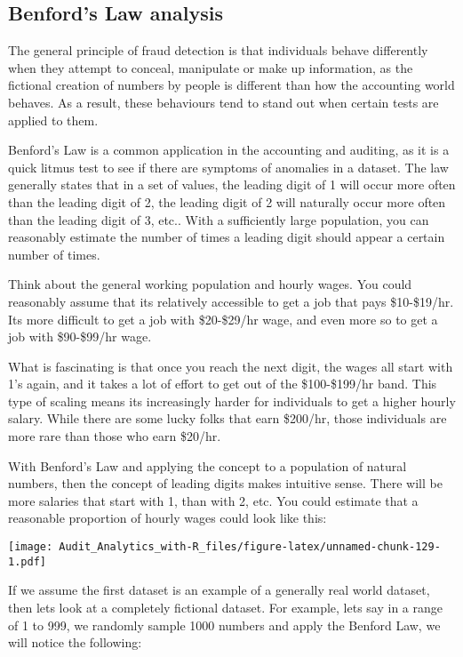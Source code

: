 \documentclass[
]{book}
\begin{document}
\hypertarget{benfords-law-analysis}{%
\subsection{Benford's Law analysis}\label{benfords-law-analysis}}

The general principle of fraud detection is that individuals behave differently when they attempt to conceal, manipulate or make up information, as the fictional creation of numbers by people is different than how the accounting world behaves. As a result, these behaviours tend to stand out when certain tests are applied to them.

Benford's Law is a common application in the accounting and auditing, as it is a quick litmus test to see if there are symptoms of anomalies in a dataset. The law generally states that in a set of values, the leading digit of 1 will occur more often than the leading digit of 2, the leading digit of 2 will naturally occur more often than the leading digit of 3, etc.. With a sufficiently large population, you can reasonably estimate the number of times a leading digit should appear a certain number of times.

Think about the general working population and hourly wages. You could reasonably assume that its relatively accessible to get a job that pays \$10-\$19/hr. Its more difficult to get a job with \$20-\$29/hr wage, and even more so to get a job with \$90-\$99/hr wage.

What is fascinating is that once you reach the next digit, the wages all start with 1's again, and it takes a lot of effort to get out of the \$100-\$199/hr band. This type of scaling means its increasingly harder for individuals to get a higher hourly salary. While there are some lucky folks that earn \$200/hr, those individuals are more rare than those who earn \$20/hr.

With Benford's Law and applying the concept to a population of natural numbers, then the concept of leading digits makes intuitive sense. There will be more salaries that start with 1, than with 2, etc. You could estimate that a reasonable proportion of hourly wages could look like this:

\texttt{[image: Audit\_Analytics\_with-R\_files/figure-latex/unnamed-chunk-129-1.pdf]}

If we assume the first dataset is an example of a generally real world dataset, then lets look at a completely fictional dataset. For example, lets say in a range of 1 to 999, we randomly sample 1000 numbers and apply the Benford Law, we will notice the following:
\end{document}
